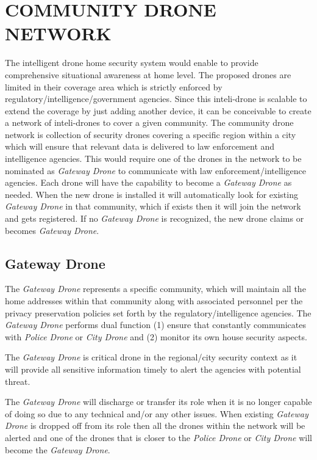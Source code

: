 \documentclass[sigconf]{acmart}
\begin{document}
\section{COMMUNITY DRONE NETWORK}
The intelligent drone home security system would enable to provide comprehensive situational awareness at home level. The proposed drones are limited in their coverage area which is strictly enforced by regulatory/intelligence/government agencies. Since this inteli-drone is scalable to extend the coverage by just adding another device, it can be conceivable to create a network of inteli-drones to cover a given community. The community drone network is collection of security drones covering a specific region within a city which will ensure that relevant data is delivered to law enforcement and intelligence agencies. This would require one of the drones in the network to be nominated as \textit{Gateway Drone} to communicate with law enforcement/intelligence agencies. Each drone will have the capability to become a \textit{Gateway Drone} as needed. When the new drone is installed it will automatically look for existing \textit{Gateway Drone} in that community, which if exists then it will join the network and gets registered. If no \textit{Gateway Drone} is recognized, the new drone claims or becomes \textit{Gateway Drone}.

\subsection{Gateway Drone}
The \textit{Gateway Drone} represents a specific community, which will maintain all the home addresses within that community along with associated personnel per the privacy preservation policies set forth by the regulatory/intelligence agencies. The \textit{Gateway Drone} performs dual function (1) ensure that constantly communicates with \textit{Police Drone} or \textit{City Drone} and (2) monitor its own house security aspects.

The \textit{Gateway Drone} is critical drone in the regional/city security context as it will provide all sensitive information timely to alert the agencies with potential threat.

The \textit{Gateway Drone} will discharge or transfer its role when it is no longer capable of doing so due to any technical and/or any other issues. When existing \textit{Gateway Drone} is dropped off from its role then all the drones within the network will be alerted and one of the drones that is closer to the \textit{Police Drone} or \textit{City Drone} will become the \textit{Gateway Drone}. 
\end{document}
